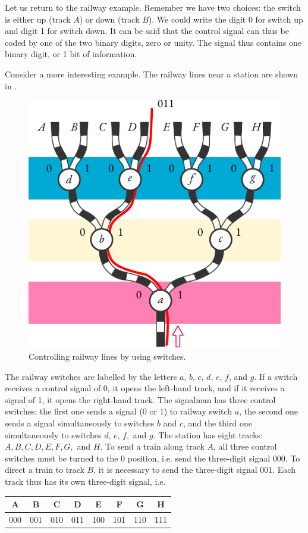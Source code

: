 Let us return to the railway example. Remember we have two choices:
the switch is either up (track $A$) or down (track $B$). We could write the
digit 0 for switch up and digit 1 for switch down. It can be said that the
control signal can thus be coded by one of the two binary digits, zero or
unity. The signal thus contains one binary digit, or 1 bit of information.

Consider a more interesting example. The railway lines near a station
are shown in . 

\begin{figure}[!ht]
 \centering
 \includegraphics[width=0.8\linewidth]{figures/railway-switches.pdf}
\caption{Controlling railway lines by using switches.\label{railway-switches}}
 \end{figure}

The railway switches are labelled by the letters $a, \,
b, \, c, \, d, \, e, \, f$, and $g$. If a switch receives a control signal of 0, it opens the left-hand track, and if it receives a signal of 1, it opens the right-hand
track. The signalman has three control switches: the first one sends
a signal (0 or 1) to railway switch $a$, the second one sends a signal
simultaneously to switches $b$ and $c$, and the third one simultaneously to
switches $d, \, e, \, f,$ and $g$. The station has eight tracks: $A, B, C, D, E, F, G,$ and $H$. To send a train along track $A$, all three control switches must be turned to the 0 position, i.e. send the three-digit signal 000. To direct
a train to track $B$, it is necessary to send the three-digit signal 001. Each
track thus has its own three-digit signal, i.e.
\begin{center}
\setlength\arrayrulewidth{0.75pt}
\begin{tabular}{cccccccc}
\toprule
A & B & C & D & E & F & G & H\\
\midrule
000 & 001 & 010 & 011 & 100 & 101 & 110 & 111 \\
\bottomrule
\end{tabular}
\end{center}

